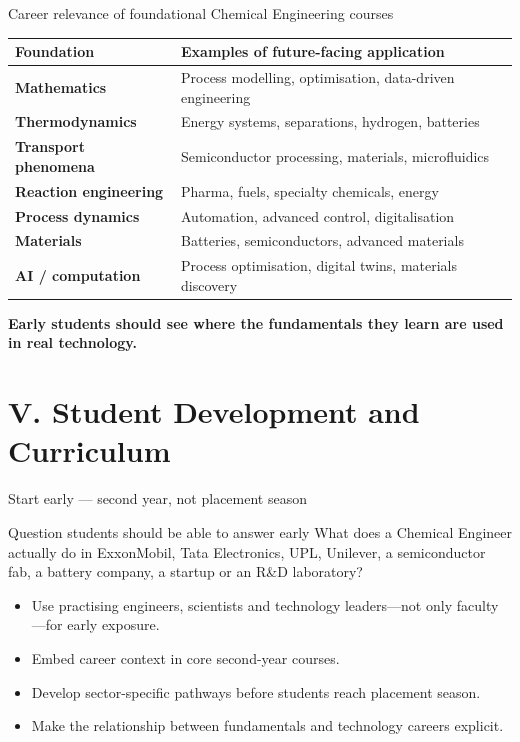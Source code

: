 \documentclass[aspectratio=169,11pt]{beamer}
\newcommand{\key}[1]{\textbf{\color{IITblue}#1}}
\begin{document}
\begin{frame}{Career relevance of foundational Chemical Engineering courses}
\begin{tabularx}{\textwidth}{>{\bfseries}p{3.2cm} X}
\toprule
Foundation & Examples of future-facing application \\
\midrule
Mathematics & Process modelling, optimisation, data-driven engineering \\
Thermodynamics & Energy systems, separations, hydrogen, batteries \\
Transport phenomena & Semiconductor processing, materials, microfluidics \\
Reaction engineering & Pharma, fuels, specialty chemicals, energy \\
Process dynamics & Automation, advanced control, digitalisation \\
Materials & Batteries, semiconductors, advanced materials \\
AI / computation & Process optimisation, digital twins, materials discovery \\
\bottomrule
\end{tabularx}
\vspace{4mm}
\centering\key{Early students should see where the fundamentals they learn are used in real technology.}
\end{frame}

\section{V. Student Development and Curriculum}
\begin{frame}{Start early — second year, not placement season}
\begin{block}{Question students should be able to answer early}
What does a Chemical Engineer actually do in ExxonMobil, Tata Electronics, UPL, Unilever, a semiconductor fab, a battery company, a startup or an R\&D laboratory?
\end{block}
\begin{itemize}
\item Use practising engineers, scientists and technology leaders—not only faculty—for early exposure.
\item Embed career context in core second-year courses.
\item Develop sector-specific pathways before students reach placement season.
\item Make the relationship between fundamentals and technology careers explicit.
\end{itemize}
\end{frame}
\end{document}
